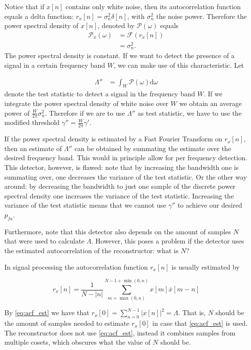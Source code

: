 \documentclass[a4paper, openany, oneside]{memoir}
\begin{document}
Notice that if $x[n]$ contains only white noise, then its autocorrelation function equals a delta function: $r_x[n] = \sigma_n^2\delta[n]$, with $\sigma_n^2$ the noise power. Therefore the power spectral density of $x[n]$, denoted by $\mathcal{P}(\omega)$ equals  
 \begin{align*}
 \mathcal{P}_x(\omega) &= \mathcal{F}(r_x[n])\\
  &= \sigma_n^2.
 \end{align*} The power spectral density is constant. If we want to detect the presence of a signal in a certain frequency band $W$, we can make use of this characteristic. Let

 \begin{align*}
 \Lambda'' &= \int_W \mathcal{P}(\omega) \text{d}\omega
 \end{align*}
denote the test statistic to detect a signal in the frequency band $W$.
 If we integrate the power spectral density of white noise over $W$ we obtain an average power of  $\frac{W}{2\pi} \sigma_n^2$. Therefore if we are to use $\Lambda''$ as test statistic, we have to use the modified threshold $\gamma'' = \frac{W}{2\pi} \gamma'$. 

 If the power spectral density is estimated by a Fast Fourier Transform on $r_x[n]$, then an estimate of $\Lambda''$ can be obtained by summating
 the estimate over the desired frequency band. This would in principle allow for per frequency detection. This detector, however, is flawed: note that by increasing the bandwidth one is summating over, one decreases the variance of the test statistic. Or the other way around: by decreasing the bandwidth to just one sample of the discrete power spectral density one increases the variance of the test statistic. Increasing the variance of the test statistic means that we cannot use $\gamma''$ to achieve our desired $p_{fa}$. 
 
Furthermore, note that this detector also depends on the amount of samples $N$ that were used to calculate $\Lambda$. However, this poses a problem if the detector uses the estimated autocorrelation of the reconstructor: what is $N$?

In signal processing the autocorrelation function $r_x[n]$ is usually estimated by 

\begin{equation}\label{eq:acf_est}
r_x[n] = \frac{1}{N-|n|}\sum_{m=\max(0,n)}^{N-1+\min(0,n)} x[m]\overline{x}[m-n]
\end{equation}

By \cref{eq:acf_est} we have that $r_x[0] = \sum_{n=0}^{N-1} |x[n]|^2 = \Lambda$. That is, $N$ should be the amount of samples needed to estimate $r_x[0]$ in case that \cref{eq:acf_est} is used. 
The reconstructor does not use \cref{eq:acf_est}, instead it combines samples from multiple cosets, which obscures what the value of $N$ should be. 
\end{document}
